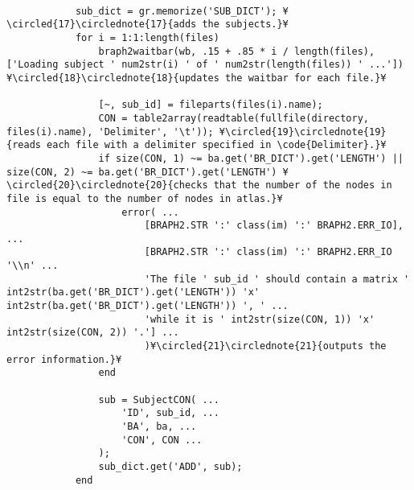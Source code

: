 \documentclass{tufte-handout}
\begin{document}
\begin{lstlisting}
            
            sub_dict = gr.memorize('SUB_DICT'); ¥\circled{17}\circlednote{17}{adds the subjects.}¥
            for i = 1:1:length(files)
                braph2waitbar(wb, .15 + .85 * i / length(files), ['Loading subject ' num2str(i) ' of ' num2str(length(files)) ' ...']) ¥\circled{18}\circlednote{18}{updates the waitbar for each file.}¥

                [~, sub_id] = fileparts(files(i).name);
                CON = table2array(readtable(fullfile(directory, files(i).name), 'Delimiter', '\t')); ¥\circled{19}\circlednote{19}{reads each file with a delimiter specified in \code{Delimiter}.}¥
                if size(CON, 1) ~= ba.get('BR_DICT').get('LENGTH') || size(CON, 2) ~= ba.get('BR_DICT').get('LENGTH') ¥\circled{20}\circlednote{20}{checks that the number of the nodes in file is equal to the number of nodes in atlas.}¥
                    error( ...
                        [BRAPH2.STR ':' class(im) ':' BRAPH2.ERR_IO], ...
                        [BRAPH2.STR ':' class(im) ':' BRAPH2.ERR_IO '\\n' ...
                        'The file ' sub_id ' should contain a matrix ' int2str(ba.get('BR_DICT').get('LENGTH')) 'x' int2str(ba.get('BR_DICT').get('LENGTH')) ', ' ...
                        'while it is ' int2str(size(CON, 1)) 'x' int2str(size(CON, 2)) '.'] ...
                        )¥\circled{21}\circlednote{21}{outputs the error information.}¥
                end
                
                sub = SubjectCON( ...
                    'ID', sub_id, ...
                    'BA', ba, ...
                    'CON', CON ...
                );
                sub_dict.get('ADD', sub);
            end
            

\end{lstlisting}
\end{document}
